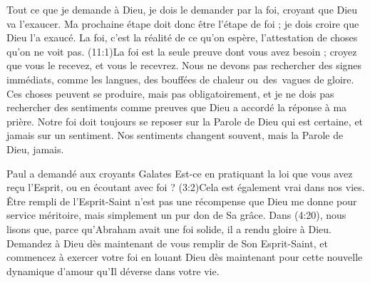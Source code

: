Tout ce que je demande à Dieu, je dois le demander par la foi,
 croyant que Dieu va l'exaucer. Ma prochaine étape doit donc être
 l'étape de foi ; je dois croire que Dieu l'a exaucé.
 La foi, c'est la réalité de ce qu'on espère,
 l'attestation de choses qu'on ne voit pas.
 (11:1)La foi est la seule preuve dont vous avez besoin ;
 croyez que vous le recevez, et vous le recevrez.
 Nous ne devons pas rechercher des signes immédiats, comme les langues,
 des bouffées de chaleur ou~des~vagues de gloire.
 Ces choses peuvent se produire, mais pas obligatoirement,
 et je ne dois pas rechercher des sentiments comme preuves
 que Dieu a accordé la réponse à ma prière. Notre foi doit toujours se reposer
 sur la Parole de Dieu qui est certaine, et jamais sur un sentiment.
 Nos sentiments changent souvent, mais la Parole de Dieu, jamais.

Paul a demandé aux croyants Galates\frcolon{}
 \Og Est-ce en pratiquant la loi que vous avez reçu l'Esprit,
 ou en écoutant avec foi ? \Fg{}
 (3:2)Cela est également vrai dans nos vies.
 Être rempli de l'Esprit-Saint n'est pas une récompense que Dieu
 me donne pour service méritoire, mais simplement un pur don de Sa grâce.
 Dans (4:20), nous lisons que, parce qu'Abraham avait
 une foi solide, il a rendu gloire à Dieu.
 Demandez à Dieu dès maintenant de vous remplir de Son Esprit-Saint,
 et commencez à exercer votre foi en louant Dieu dès maintenant
 pour cette nouvelle dynamique d'amour qu'Il déverse dans votre vie.
\closechapter

